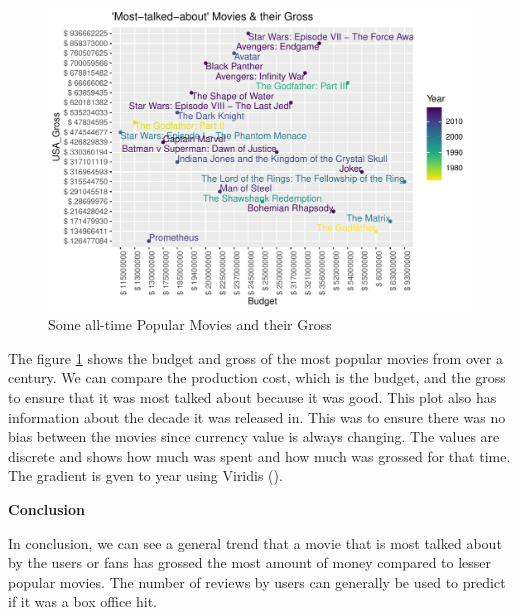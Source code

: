 \documentclass[11pt,a4paper,]{article}
\begin{document}
\begin{figure}[H]

{\centering \includegraphics{Report_files/figure-latex/AllGrossPlot-1} 

}

\caption{Some all-time Popular Movies and their Gross}\label{fig:AllGrossPlot}
\end{figure}

The figure \ref{fig:AllGrossPlot} shows the budget and gross of the most popular movies from over a century. We can compare the production cost, which is the budget, and the gross to ensure that it was most talked about because it was good. This plot also has information about the decade it was released in. This was to ensure there was no bias between the movies since currency value is always changing. The values are discrete and shows how much was spent and how much was grossed for that time. The gradient is gven to year using Viridis (\textcite{viridis}).

\textbf{Conclusion}

In conclusion, we can see a general trend that a movie that is most talked about by the users or fans has grossed the most amount of money compared to lesser popular movies. The number of reviews by users can generally be used to predict if it was a box office hit.

\printbibliography
\end{document}
